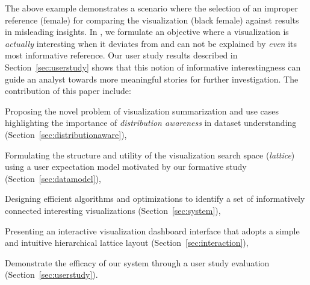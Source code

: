 The above example demonstrates a scenario where the selection of an improper reference (female) for comparing the visualization (black female) against results in misleading insights. In \system, we formulate an objective where a visualization is \emph{actually} interesting when it deviates from and can not be explained by \emph{even} its most informative reference. %
Our user study results described in Section~\ref{sec:userstudy} shows that this notion of informative interestingness can guide an analyst towards more meaningful stories for further investigation. The contribution of this paper include:
\begin{denselist}
\item Proposing the novel problem of visualization summarization and use cases highlighting the importance of \textit{distribution awareness} in dataset understanding (Section~\ref{sec:distributionaware}), %
\item Formulating the structure and utility of the visualization search space (\emph{lattice}) using a user expectation model motivated by our formative study (Section~\ref{sec:datamodel}),
\item Designing efficient algorithms and optimizations to identify a set of informatively connected interesting visualizations (Section~\ref{sec:system}),
\item Presenting an interactive visualization dashboard interface that adopts a simple and intuitive hierarchical lattice layout (Section~\ref{sec:interaction}),
\item Demonstrate the efficacy of our system through a user study evaluation (Section~\ref{sec:userstudy}).
\end{denselist}
\fi

